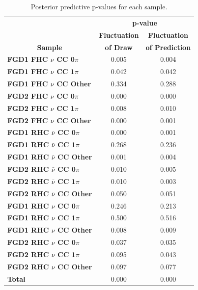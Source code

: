 \begin{center}
\begin{table}[!htbp]
\center
\begin{tabular}{l||c c}
\hline \hline
& \multicolumn{2}{c}{\textbf{p-value}} \\
& \multicolumn{1}{c}{\textbf{Fluctuation}} & \multicolumn{1}{c}{\textbf{Fluctuation}} \\
\multicolumn{1}{c||}{\textbf{Sample}} & \multicolumn{1}{c}{\textbf{of Draw}} & \multicolumn{1}{c}{\textbf{of Prediction}} \\
\hline\hline
\textbf{FGD1 FHC $\nu$ CC 0$\pi$} & 0.005 & 0.004\\ 
\textbf{FGD1 FHC $\nu$ CC 1$\pi$} & 0.042 & 0.042\\
\textbf{FGD1 FHC $\nu$ CC Other} & 0.334 & 0.288\\ \hline
\textbf{FGD2 FHC $\nu$ CC 0$\pi$} & 0.000 & 0.000\\ 
\textbf{FGD2 FHC $\nu$ CC 1$\pi$} & 0.008 & 0.010\\ 
\textbf{FGD2 FHC $\nu$ CC Other} & 0.000 & 0.001\\ \hline
\textbf{FGD1 RHC $\bar{\nu}$ CC 0$\pi$} & 0.000 & 0.001\\
\textbf{FGD1 RHC $\bar{\nu}$ CC 1$\pi$} & 0.268 & 0.236\\
\textbf{FGD1 RHC $\bar{\nu}$ CC Other} & 0.001 & 0.004\\ \hline
\textbf{FGD2 RHC $\bar{\nu}$ CC 0$\pi$} & 0.010 & 0.005\\
\textbf{FGD2 RHC $\bar{\nu}$ CC 1$\pi$} & 0.010 & 0.003\\
\textbf{FGD2 RHC $\bar{\nu}$ CC Other} & 0.050 & 0.051\\ \hline
\textbf{FGD1 RHC $\nu$ CC 0$\pi$} & 0.246 & 0.213\\
\textbf{FGD1 RHC $\nu$ CC 1$\pi$} & 0.500 & 0.516\\
\textbf{FGD1 RHC $\nu$ CC Other} & 0.008 & 0.009\\ \hline
\textbf{FGD2 RHC $\nu$ CC 0$\pi$} & 0.037 & 0.035\\
\textbf{FGD2 RHC $\nu$ CC 1$\pi$} & 0.095 & 0.043\\
\textbf{FGD2 RHC $\nu$ CC Other} & 0.097 & 0.077\\ \hline
\textbf{Total} & 0.000 & 0.000 \\ \hline\hline
\end{tabular}
\caption{Posterior predictive p-values for each sample.}
\label{tab:pval}
\end{table}
\end{center}

